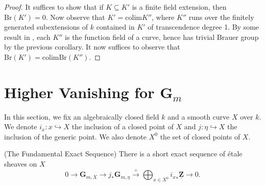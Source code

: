 \begin{proof}
It suffices to show that if $K \subseteq K'$ is a finite field extension, then
$\text{Br}(K') = 0$. Now observe that $K' = \text{colim} K''$, where $K''$ runs
over the finitely generated subextensions of $k$ contained in $K'$ of
transcendence degree 1. By some result in \cite{H}, each $K''$ is the function
field of a curve, hence has trivial Brauer group by the previous corollary. It
now suffices to observe that $\text{Br}(K') = \text{colim} \text{Br}(K'')$.
\end{proof}






\section{Higher Vanishing for $\mathbf{G}_m$}
\label{section-higher-Gm}

\noindent
In this section, we fix an algebraically closed field $k$ and a smooth curve
$X$ over $k$. We denote $i_x : x \hookrightarrow X$ the inclusion of a closed
point of $X$ and $j : \eta \hookrightarrow X$ the inclusion of the generic
point. We also denote $X^0$ the set of closed points of $X$.

\begin{theorem}
\label{theorem-fundamental-exact-sequence}
(The Fundamental Exact Sequence)
There is a short exact sequence of \'etale sheaves on $X$
$$
0 \longrightarrow \mathbf{G}_{m,X} \longrightarrow j_* \mathbf{G}_{m,\eta}
\xrightarrow{\ \div\ } \bigoplus_{x \in X^0} {i_x}_* \underline{\mathbf{Z}}
\longrightarrow 0.
$$
\end{theorem}

